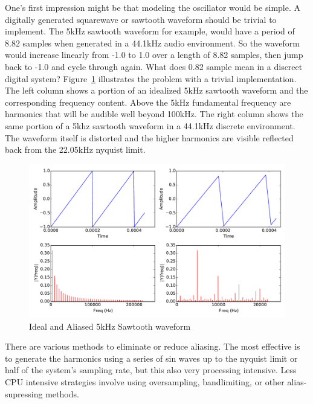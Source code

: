 One's first impression might be that modeling the oscillator would be simple. A digitally generated squarewave or sawtooth waveform should be trivial to implement. The 5kHz sawtooth waveform for example, would have a period of 8.82 samples when generated in a 44.1kHz audio environment. So the waveform would increase linearly from -1.0 to 1.0 over a length of 8.82 samples, then jump back to -1.0 and cycle through again. What does 0.82 sample mean in a discreet digital system? Figure~\ref{fig:aliasing_sawtooth} illustrates the problem with a trivial implementation. The left column shows a portion of an idealized 5kHz sawtooth waveform and the corresponding frequency content. Above the 5kHz fundamental frequency are harmonics that will be audible well beyond 100kHz. The right column shows the same portion of a 5khz sawtooth waveform in a 44.1kHz discrete environment. The waveform itself is distorted and the higher harmonics are visible reflected back from the 22.05kHz nyquist limit.

\begin{figure}[H]
    \centering
    \includegraphics[width=\textwidth]{plots/graphics/sawtooth.pdf}
    \caption{Ideal and Aliased 5kHz Sawtooth waveform}
    \label{fig:aliasing_sawtooth}
\end{figure}

There are various methods to eliminate or reduce aliasing. The most effective is to generate the harmonics using a series of sin waves up to the nyquist limit or half of the system's sampling rate, but this also very processing intensive. Less CPU intensive strategies involve using oversampling, bandlimiting, or other alias-supressing methods\cite{virtual_analog_synthesis}.

